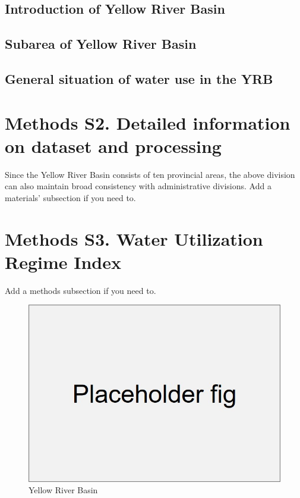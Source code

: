 \documentclass[9pt,twoside,lineno]{pnas-new}
\begin{document}
\subsection*{Introduction of Yellow River Basin}
\subsection*{Subarea of Yellow River Basin}
\subsection*{General situation of water use in the YRB}

\section*{Methods S2. Detailed information on dataset and processing}
Since the Yellow River Basin consists of ten provincial areas, the above division can also maintain broad consistency with administrative divisions.
Add a materials' subsection if you need to.

\section*{Methods S3. Water Utilization Regime Index}
Add a methods subsection if you need to.


\begin{figure}
    \centering
    \includegraphics[width=\textwidth]{../../figures/placeholder_s}
    \caption{Yellow River Basin}
\end{figure}
\end{document}
